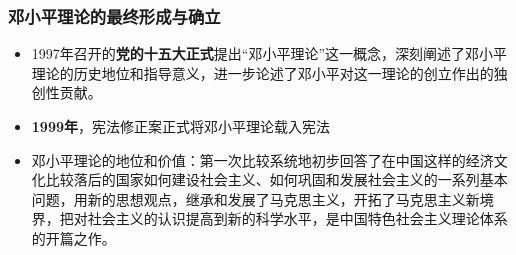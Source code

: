 \documentclass[12pt,openany]{ctexbook}
\begin{document}
\subsubsection{邓小平理论的最终形成与确立}
\begin{itemize}
  \item 1997年召开的\textbf{党的十五大正式}提出“邓小平理论”这一概念，深刻阐述了邓小平理论的历史地位和指导意义，进一步论述了邓小平对这一理论的创立作出的独创性贡献。
  \item \textbf{1999年}，宪法修正案正式将邓小平理论载入宪法
  \item 邓小平理论的地位和价值：第一次比较系统地初步回答了在中国这样的经济文化比较落后的国家如何建设社会主义、如何巩固和发展社会主义的一系列基本问题，用新的思想观点，继承和发展了马克思主义，开拓了马克思主义新境界，把对社会主义的认识提高到新的科学水平，是中国特色社会主义理论体系的开篇之作。
\end{itemize}
\end{document}
